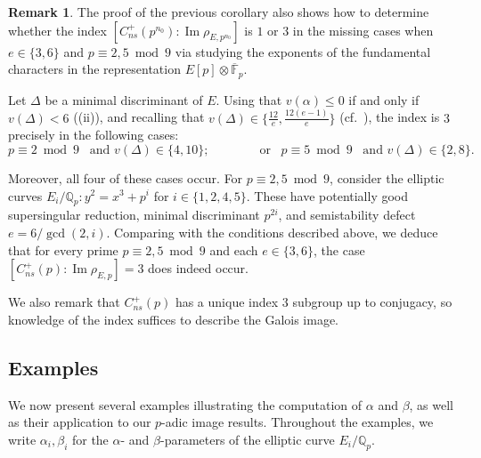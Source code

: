 \documentclass{amsart}
\theoremstyle{definition}
\newtheorem{remark}[theorem]{Remark}
\newcommand{\Q}{\mathbb{Q}}
\newcommand{\F}{\mathbb{F}}
\numberwithin{theorem}{section}
\numberwithin{equation}{section}
\begin{document}
\begin{remark}\label{rmk: index 3}
The proof of the previous corollary also shows how to determine whether the index $[C_{ns}^+(p^{n_0}) : \operatorname{Im}\rho_{E,p^{n_0}}]$ is $1$ or $3$ in the missing cases when $e \in \{3,6\}$ and $p \equiv 2,5 \bmod{9}$ via studying the exponents of the fundamental characters in the representation $E[p] \otimes \overline{\F}_p$.

Let $\Delta$ be a minimal discriminant of $E$. Using that $v(\alpha) \leq 0$ if and only if $v(\Delta)<6$ ((ii)), and recalling that $v(\Delta) \in \{\frac{12}{e},\frac{12(e-1)}{e}\}$ (cf.~), the index is $3$ precisely in the following cases:
\[
 p \equiv 2 \bmod{9} \,\,\, \text{ and } v(\Delta) \in \{4,10\}; \qquad\qquad \text{or } \,\,\, p \equiv 5 \bmod{9} \,\,\, \text{ and } v(\Delta) \in \{2,8\}.
\]

Moreover, all four of these cases occur. For $p \equiv 2, 5 \bmod{9}$, consider the elliptic curves $E_i/\Q_p : y^2 = x^3 + p^i$ for $i \in \{1, 2, 4, 5\}$. These have potentially good supersingular reduction, minimal discriminant $p^{2i}$, and semistability defect $e = 6/\gcd(2,i)$. Comparing with the conditions described above, we deduce that for every prime $p \equiv 2,5 \bmod{9}$ and each $e \in \{3,6\}$, the case $[C_{ns}^+(p) : \operatorname{Im}\rho_{E,p}] = 3$ does indeed occur.

We also remark that $C_{ns}^+(p)$ has a unique index $3$ subgroup up to conjugacy, so knowledge of the index suffices to describe the Galois image.
\end{remark}


\subsection{Examples}
 
We now present several examples illustrating the computation of $\alpha$ and $\beta$, as well as their application to our $p$-adic image results. Throughout the examples, we write $\alpha_i, \beta_i$ for the $\alpha$- and $\beta$-parameters of the elliptic curve $E_i/\Q_p$.
\end{document}

